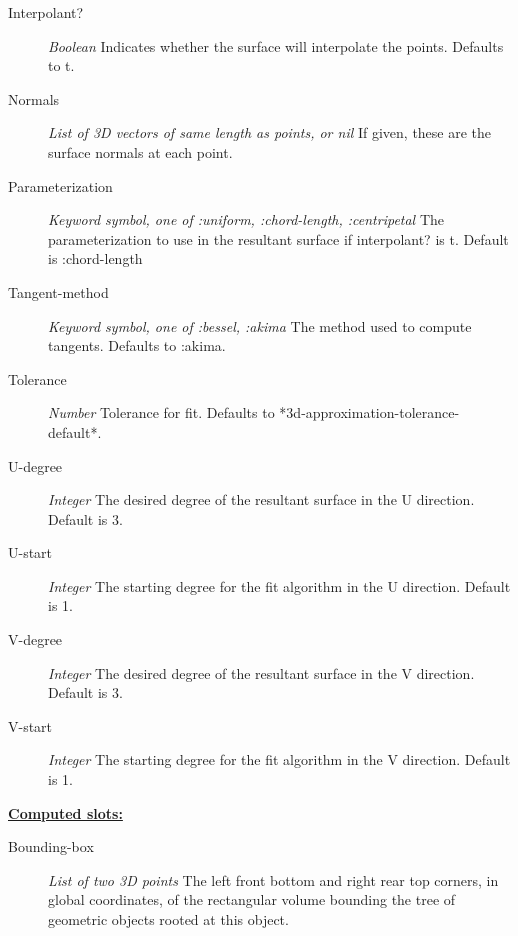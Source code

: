 \documentclass [11pt]{book}
\begin{document}
\begin{itemize}
\begin{description}
\item [Interpolant?]
\emph{Boolean} Indicates whether the surface will interpolate the points. Defaults to t.


\item [Normals]
\emph{List of 3D vectors of same length as points, or nil} If given, these are the surface normals at each point.


\item [Parameterization]
\emph{Keyword symbol, one of :uniform, :chord-length, :centripetal} The parameterization to use in the resultant surface if
interpolant? is t. Default is :chord-length


\item [Tangent-method]
\emph{Keyword symbol, one of :bessel, :akima}  The method used to compute tangents. Defaults to :akima.


\item [Tolerance]
\emph{Number} Tolerance for fit. Defaults to *3d-approximation-tolerance-default*.


\item [U-degree]
\emph{Integer} The desired degree of the resultant surface in the U direction. Default is 3.


\item [U-start]
\emph{Integer} The starting degree for the fit algorithm in the U direction. Default is 1.


\item [V-degree]
\emph{Integer} The desired degree of the resultant surface in the V direction. Default is 3.


\item [V-start]
\emph{Integer} The starting degree for the fit algorithm in the V direction. Default is 1.


\end{description}






\textbf{
\underline{Computed slots:}}

\begin{description}

\item [Bounding-box]
\emph{List of two 3D points} The left front bottom and right rear top corners, in global coordinates,
of the rectangular volume bounding the tree of geometric objects rooted at this object.



\end{description}
\end{itemize}
\end{document}
